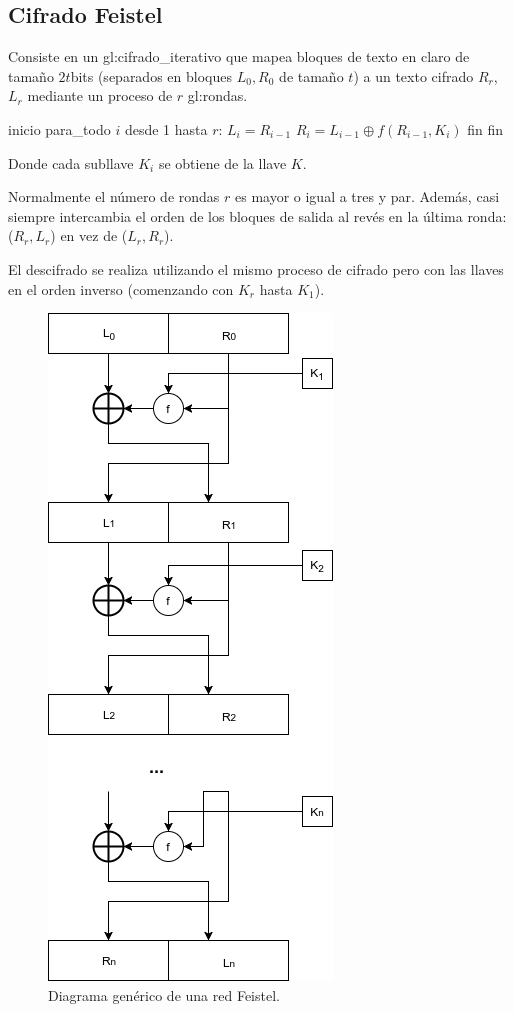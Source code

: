 %
%

\subsection{Cifrado Feistel}

Consiste en un \gls{gl:cifrado_iterativo} que mapea bloques de
texto en claro de tamaño $2t$bits (separados en bloques
$L_0, R_0$ de tamaño $t$) a un texto cifrado $R_r$, $L_r$
mediante un proceso de $r$ \glspl{gl:ronda}.

\begin{pseudocodigo}[caption={Feistel, cifrado.}, label={feistel:1}]
  inicio
  para_todo $i$ desde 1 hasta $r$:
    $L_i = R_{i-1}$
    $R_i = L_{i-1} \oplus f(R_{i-1}, K_i)$
  fin
  fin
\end{pseudocodigo}

Donde cada subllave $K_i$ se obtiene de la llave $K$.

Normalmente el número de rondas $r$ es mayor o igual a tres y par.
Además, casi siempre intercambia el orden de los bloques de salida al
revés en la última ronda: ($R_r, L_r$) en vez de ($L_r, R_r$).

El descifrado se realiza utilizando el mismo proceso de cifrado pero
con las llaves en el orden inverso (comenzando con $K_r$ hasta $K_1$).

\begin{figure}[H]
  \begin{center}
    \includegraphics[width=0.4\linewidth]{diagramas/feistel}
     \caption{Diagrama genérico de una red Feistel.}
   \end{center}
\end{figure}
